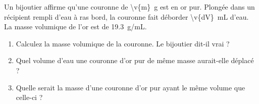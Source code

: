 Un bijoutier affirme qu'une couronne de \qty{\v{m}}{g} est en or pur. Plongée dans un récipient rempli d'eau à ras bord, la couronne fait déborder \qty{\v{dV}}{mL} d'eau. La masse volumique de l'or est de \qty{19.3}{g/mL}.

\begin{enumerate}[label=\alph*)]
    \item Calculez la masse volumique de la couronne. Le bijoutier dit-il vrai ?
    \item Quel volume d'eau une couronne d'or pur de même masse aurait-elle déplacé ?
    \item Quelle serait la masse d'une couronne d'or pur ayant le même volume que celle-ci ?
\end{enumerate}
